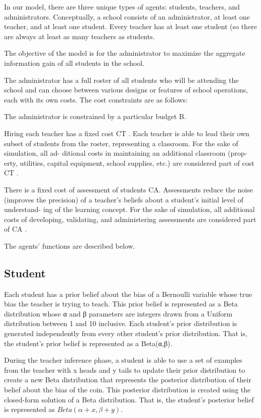 \documentclass[10pt, letterpaper]{article}
\begin{document}
In our model, there are three unique types of agents: students,
teachers, and administrators. Conceptually, a school consists of an
administrator, at least one teacher, and at least one student. Every
teacher has at least one student (so there are always at least as many
teachers as students.

The objective of the model is for the administrator to maximize the
aggregate information gain of all students in the school.

The administrator has a full roster of all students who will be
attending the school and can choose between various designs or features
of school operations, each with its own costs. The cost constraints are
as follows:

The administrator is constrained by a particular budget B.

Hiring each teacher has a fixed cost CT . Each teacher is able to lead
their own subset of students from the roster, representing a classroom.
For the sake of simulation, all ad- ditional costs in maintaining an
additional classroom (prop- erty, utilities, capital equipment, school
supplies, etc.) are considered part of cost CT .

There is a fixed cost of assessment of students CA. Assessments reduce
the noise (improves the precision) of a teacher's beliefs about a
student's initial level of understand- ing of the learning concept. For
the sake of simulation, all additional costs of developing, validating,
and administering assessments are considered part of CA .

The agents' functions are described below.

\subsection{Student}\label{student}

Each student has a prior belief about the bias of a Bernoulli variable
whose true bias the teacher is trying to teach. This prior belief is
represented as a Beta distribution whose α and β parameters are integers
drawn from a Uniform distribution between 1 and 10 inclusive. Each
student's prior distribution is generated independently from every other
student's prior distribution. That is, the student's prior belief is
represented as a Beta(α,β).

During the teacher inference phase, a student is able to use a set of
examples from the teacher with x heads and y tails to update their prior
distribution to create a new Beta distribution that represents the
posterior distribution of their belief about the bias of the coin. This
posterior distribution is created using the closed-form solution of a
Beta distribution. That is, the student's posterior belief is
represented as \(Beta(\alpha + x, \beta + y)\).
\end{document}

